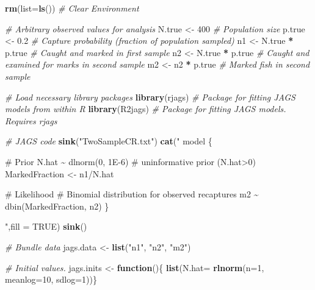 \documentclass[
]{krantz}
\makeatletter
\newenvironment{Shaded}{\begin{snugshade}}{\end{snugshade}}
\newcommand{\AttributeTok}[1]{\textcolor[rgb]{0.27,0.27,0.27}{#1}}
\newcommand{\CommentTok}[1]{\textcolor[rgb]{0.37,0.37,0.37}{\textit{#1}}}
\newcommand{\ConstantTok}[1]{\textcolor[rgb]{0.37,0.37,0.37}{#1}}
\newcommand{\ControlFlowTok}[1]{\textcolor[rgb]{0.27,0.27,0.27}{\textbf{#1}}}
\newcommand{\DecValTok}[1]{\textcolor[rgb]{0.06,0.06,0.06}{#1}}
\newcommand{\FloatTok}[1]{\textcolor[rgb]{0.06,0.06,0.06}{#1}}
\newcommand{\FunctionTok}[1]{\textcolor[rgb]{0.27,0.27,0.27}{\textbf{#1}}}
\newcommand{\NormalTok}[1]{#1}
\newcommand{\OtherTok}[1]{\textcolor[rgb]{0.37,0.37,0.37}{#1}}
\newcommand{\SpecialCharTok}[1]{\textcolor[rgb]{0.43,0.43,0.43}{\textbf{#1}}}
\newcommand{\StringTok}[1]{\textcolor[rgb]{0.5,0.5,0.5}{#1}}
\newenvironment{kframe}{%
\medskip{}
\setlength{\fboxsep}{.8em}
 \def\at@end@of@kframe{}%
 \ifinner\ifhmode%
  \def\at@end@of@kframe{\end{minipage}}%
  \begin{minipage}{\columnwidth}%
 \fi\fi%
 \def\FrameCommand##1{\hskip\@totalleftmargin \hskip-\fboxsep
 \colorbox{shadecolor}{##1}\hskip-\fboxsep
     \hskip-\linewidth \hskip-\@totalleftmargin \hskip\columnwidth}%
 \MakeFramed {\advance\hsize-\width
   \@totalleftmargin\z@ \linewidth\hsize
   \@setminipage}}%
 {\par\unskip\endMakeFramed%
 \at@end@of@kframe}
\renewenvironment{Shaded}{\begin{kframe}}{\end{kframe}}
\makeatother
\begin{document}
\begin{Shaded}
\begin{Highlighting}[]
\FunctionTok{rm}\NormalTok{(}\AttributeTok{list=}\FunctionTok{ls}\NormalTok{()) }\CommentTok{\# Clear Environment}

\CommentTok{\# Arbitrary \textquotesingle{}observed\textquotesingle{} values for analysis}
\NormalTok{N.true }\OtherTok{\textless{}{-}} \DecValTok{400}  \CommentTok{\# Population size}
\NormalTok{p.true }\OtherTok{\textless{}{-}} \FloatTok{0.2} \CommentTok{\# Capture probability (fraction of population sampled)}
\NormalTok{n1 }\OtherTok{\textless{}{-}}\NormalTok{ N.true }\SpecialCharTok{*}\NormalTok{ p.true }\CommentTok{\# Caught and marked in first sample}
\NormalTok{n2 }\OtherTok{\textless{}{-}}\NormalTok{ N.true }\SpecialCharTok{*}\NormalTok{ p.true }\CommentTok{\# Caught and examined for marks in second sample}
\NormalTok{m2 }\OtherTok{\textless{}{-}}\NormalTok{ n2 }\SpecialCharTok{*}\NormalTok{ p.true }\CommentTok{\# Marked fish in second sample}

\CommentTok{\# Load necessary library packages}
\FunctionTok{library}\NormalTok{(rjags)   }\CommentTok{\# Package for fitting JAGS models from within R}
\FunctionTok{library}\NormalTok{(R2jags)  }\CommentTok{\# Package for fitting JAGS models. Requires rjags}

\CommentTok{\# JAGS code}
\FunctionTok{sink}\NormalTok{(}\StringTok{"TwoSampleCR.txt"}\NormalTok{)}
\FunctionTok{cat}\NormalTok{(}\StringTok{"}
\StringTok{    model \{}

\StringTok{  \# Prior}
\StringTok{    N.hat \textasciitilde{} dlnorm(0, 1E{-}6) \# uninformative prior (N.hat\textgreater{}0)}
\StringTok{    MarkedFraction \textless{}{-} n1/N.hat}

\StringTok{  \# Likelihood}
\StringTok{    \# Binomial distribution for observed recaptures}
\StringTok{    m2 \textasciitilde{} dbin(MarkedFraction, n2)}
\StringTok{    \}}

\StringTok{    "}\NormalTok{,}\AttributeTok{fill =} \ConstantTok{TRUE}\NormalTok{)}
\FunctionTok{sink}\NormalTok{()}

\CommentTok{\# Bundle data}
\NormalTok{jags.data }\OtherTok{\textless{}{-}} \FunctionTok{list}\NormalTok{(}\StringTok{"n1"}\NormalTok{, }\StringTok{"n2"}\NormalTok{, }\StringTok{"m2"}\NormalTok{)}

\CommentTok{\# Initial values.}
\NormalTok{jags.inits }\OtherTok{\textless{}{-}} \ControlFlowTok{function}\NormalTok{()\{ }\FunctionTok{list}\NormalTok{(}\AttributeTok{N.hat=} \FunctionTok{rlnorm}\NormalTok{(}\AttributeTok{n=}\DecValTok{1}\NormalTok{, }\AttributeTok{meanlog=}\DecValTok{10}\NormalTok{, }\AttributeTok{sdlog=}\DecValTok{1}\NormalTok{))\}}


\end{Highlighting}
\end{Shaded}
\end{document}

